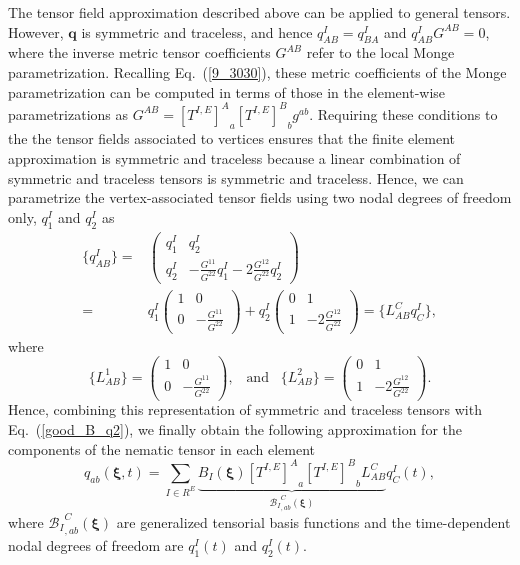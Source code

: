 The tensor field approximation described above can be applied to general tensors. However, $\bm{q}$ is symmetric and traceless, and hence $q_{AB}^I = q_{BA}^I$ and $q_{AB}^I G^{AB} = 0$, where the inverse metric tensor coefficients $G^{AB}$ refer to the local Monge parametrization. Recalling Eq.~(\ref{9_3030}), these metric coefficients of the Monge parametrization can be computed in terms of those in the element-wise parametrizations as $G^{AB} = {\left[T^{I,E}\right]^A}_a {\left[T^{I,E}\right]^B}_b g^{ab}$. Requiring these conditions to the the tensor fields associated to vertices ensures that the finite element approximation is symmetric and traceless because a linear combination of symmetric and traceless tensors is symmetric and traceless. Hence, we can parametrize the vertex-associated tensor fields using two nodal degrees of freedom only, $q_{1}^I$ and $q_{2}^I$ as 
\begin{align}
\{q_{AB}^I\} = &
\left(\begin{array}{cc}
q_{1}^I & q_{2}^I \\
q_{2}^I  & - \frac{G^{11}}{G^{22} }q_{1}^I - 2\frac{G^{12}}{G^{22} }q_{2}^I 
\end{array}\right) 
\\ = & q_{1}^I 
\left(\begin{array}{cc} 
1 & 0 \\ 
0  & - \frac{G^{11}}{G^{22} }  
\end{array}\right) 
+ q_{2}^I
\left(\begin{array}{cc}
0 & 1 \\
1  &  - 2\frac{G^{12}}{G^{22}}  
\end{array}\right) = 
\{ L^C_{AB} q_{C}^I \}, \nonumber
\end{align}
where 
\begin{equation}
\{ L^1_{AB}\} = \left(\begin{array}{cc} 
1 & 0 \\ 
0  & - \frac{G^{11}}{G^{22} }  
\end{array}\right) , \;\;\; \mbox{and} \;\;\; \{ L^2_{AB}\} = \left(\begin{array}{cc}
0 & 1 \\
1  &  - 2\frac{G^{12}}{G^{22}}  
\end{array}\right).
\end{equation}
Hence, combining this representation of symmetric and traceless tensors with Eq.~(\ref{good_B_q2}), we finally obtain the following approximation for the components of the nematic tensor in each element
\begin{equation} \label{good_B_q2}
  q_{ab}(\bm{\xi},t)= \underset{I \in R^E}{\mathrm{\sum}} \underbrace{B_I(\bm{\xi}) {\left[T^{I,E}\right]^A}_a {\left[T^{I,E}\right]^B}_b L^C_{AB}}_{{\mathcal{B}_I}_{,ab}^{C}(\bm{\xi})} q_{C}^I(t),
\end{equation} 
where ${\mathcal{B}_I}_{,ab}^{C}(\bm{\xi})$ are generalized tensorial basis functions and the time-dependent nodal degrees of freedom are  $q_1^I(t)$ and  $q_2^I(t)$.

